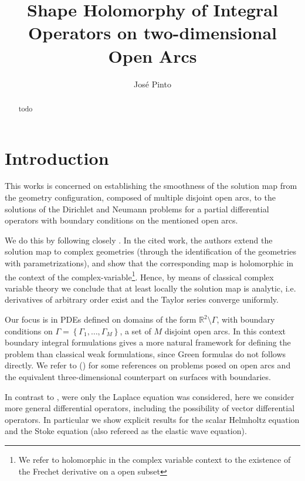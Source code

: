 \documentclass{article}
\title{Shape Holomorphy of Integral Operators on two-dimensional Open Arcs}
\author{Jos\'e Pinto}
\newcommand{\IR}{{\mathbb R}}
\begin{document}
\maketitle

\begin{abstract}
todo
\end{abstract}

\section{Introduction}
This works is concerned on establishing the smoothness of the solution map from the geometry configuration, composed of multiple disjoint open arcs, to the solutions of the Dirichlet and Neumann problems for a partial differential operators with boundary conditions on the mentioned open arcs. 

We do this by following closely \cite{Henriquez2021}. In the cited work, the authors extend the solution map to complex geometries (through the identification of the geometries with parametrizations), and show that the corresponding map is holomorphic in the context of the complex-variable\footnote{We refer to holomorphic in the complex variable context to the existence of the Frechet derivative on a open subset}. Hence, by means of classical complex variable theory we conclude that at least locally the solution map is analytic, i.e. derivatives of arbitrary order exist and the Taylor series converge uniformly. 

Our focus is in PDEs defined on domains of the form $\IR^2 \setminus \Gamma$, with boundary conditions on $\Gamma = \left\lbrace \Gamma_1, \hdots, \Gamma_M \right\rbrace$, a set of $M$ disjoint open arcs. In this context boundary integral formulations gives a more  natural framework for defining the problem than classical weak formulations, since Green formulas do not follows directly. We refer to (\cite{stephane,stephan1984augmented,STE86,Stephan1987,sloan1991,JEREZHANCKES2011547,JHP20,Averseng2019,kress1996,kress2000}) for some references on problems posed on open arcs and the equivalent three-dimensional counterpart on surfaces with boundaries.  

In contrast to \cite{Henriquez2021}, were only the Laplace equation was considered, here we consider more general differential operators, including the possibility of vector differential operators. In particular we show explicit results for the scalar Helmholtz equation and the Stoke equation (also refereed as the elastic wave equation). 
\end{document}

